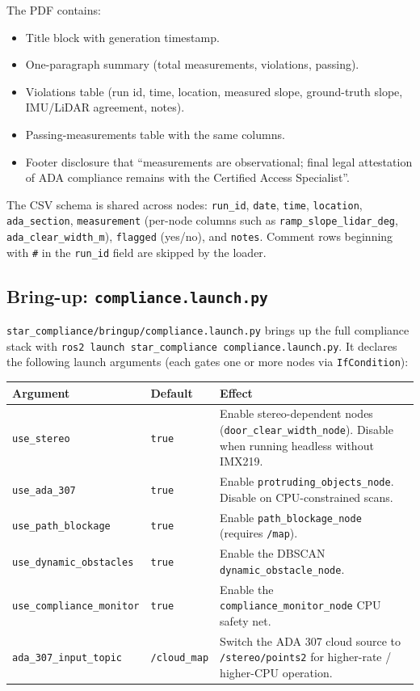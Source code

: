 The PDF contains:

\begin{itemize}
  \item Title block with generation timestamp.
  \item One-paragraph summary (total measurements, violations, passing).
  \item Violations table (run id, time, location, measured slope, ground-truth slope, IMU/LiDAR agreement, notes).
  \item Passing-measurements table with the same columns.
  \item Footer disclosure that ``measurements are observational; final legal attestation of ADA compliance remains with the Certified Access Specialist''.
\end{itemize}

The CSV schema is shared across nodes: \texttt{run\_id}, \texttt{date},
\texttt{time}, \texttt{location}, \texttt{ada\_section},
\texttt{measurement} (per-node columns such as
\texttt{ramp\_slope\_lidar\_deg}, \texttt{ada\_clear\_width\_m}),
\texttt{flagged} (yes/no), and \texttt{notes}. Comment rows beginning
with \texttt{\#} in the \texttt{run\_id} field are skipped by the
loader.

\subsection{Bring-up: \texttt{compliance.launch.py}}

\texttt{star\_compliance/bringup/compliance.launch.py} brings up the
full compliance stack with \texttt{ros2 launch star\_compliance
compliance.launch.py}. It declares the following launch arguments
(each gates one or more nodes via \texttt{IfCondition}):

\begin{center}
\begin{tabular}{|p{4.6cm}|p{2.6cm}|p{7.0cm}|}
\hline
\textbf{Argument} & \textbf{Default} & \textbf{Effect} \\
\hline
\texttt{use\_stereo}              & \texttt{true}        & Enable stereo-dependent nodes (\texttt{door\_clear\_width\_node}). Disable when running headless without IMX219. \\
\hline
\texttt{use\_ada\_307}            & \texttt{true}        & Enable \texttt{protruding\_objects\_node}. Disable on CPU-constrained scans. \\
\hline
\texttt{use\_path\_blockage}      & \texttt{true}        & Enable \texttt{path\_blockage\_node} (requires \texttt{/map}). \\
\hline
\texttt{use\_dynamic\_obstacles}  & \texttt{true}        & Enable the DBSCAN \texttt{dynamic\_obstacle\_node}. \\
\hline
\texttt{use\_compliance\_monitor} & \texttt{true}        & Enable the \texttt{compliance\_monitor\_node} CPU safety net. \\
\hline
\texttt{ada\_307\_input\_topic}   & \texttt{/cloud\_map} & Switch the ADA 307 cloud source to \texttt{/stereo/points2} for higher-rate / higher-CPU operation. \\
\hline
\end{tabular}
\end{center}


